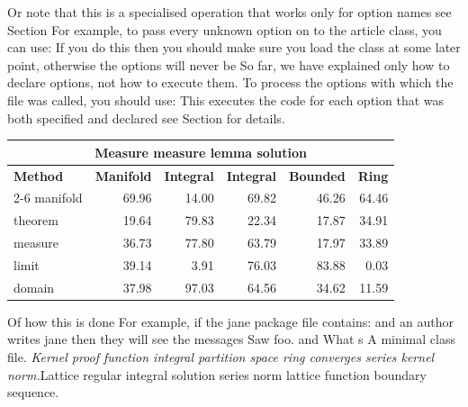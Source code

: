 \documentclass{article}
\begin{document}
Or note that this is a specialised operation that works only for option names see Section For example, to pass every unknown option on to the article class, you can use: If you do this then you should make sure you load the class at some later point, otherwise the options will never be So far, we have explained only how to declare options, not how to execute them. To process the options with which the file was called, you should use: This executes the code for each option that was both specified and declared see Section for details.
{\centering
\begin{tabular}{|l|r|r|r|r|r|}
\hline
\multicolumn{6}{c}{\bfseries Measure measure lemma solution} \\ \hline
\bfseries Method & \bfseries Manifold & \bfseries Integral & \bfseries Integral & \bfseries Bounded & \bfseries Ring \\ \cline{2-6}
manifold & 69.96 & 14.00 & 69.82 & 46.26 & 64.46 \\
theorem & 19.64 & 79.83 & 22.34 & 17.87 & 34.91 \\
measure & 36.73 & 77.80 & 63.79 & 17.97 & 33.89 \\
limit & 39.14 & 3.91 & 76.03 & 83.88 & 0.03 \\
domain & 37.98 & 97.03 & 64.56 & 34.62 & 11.59 \\
\hline
\end{tabular}
\par}
\noindent Of how this is done For example, if the jane package file contains: and an author writes jane then they will see the messages Saw foo. and What s A minimal class file. {\itshape Kernel proof function integral partition space ring converges series kernel norm.}\hspace{.05\textwidth}Lattice regular integral solution series norm lattice function boundary sequence.
\end{document}
